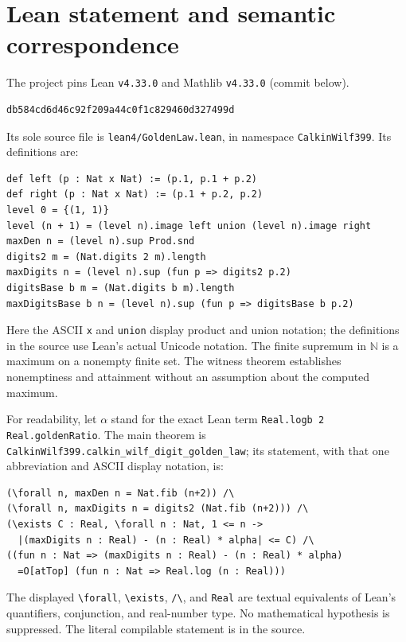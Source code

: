 \documentclass[11pt]{article}
\newcommand{\N}{\mathbb N}
\begin{document}
\section{Lean statement and semantic correspondence}
The project pins Lean \texttt{v4.33.0} and Mathlib \texttt{v4.33.0}
(commit below).
\begin{Verbatim}[fontsize=\small]
db584cd6d46c92f209a44c0f1c829460d327499d
\end{Verbatim}
Its sole source file is \texttt{lean4/GoldenLaw.lean}, in namespace \texttt{CalkinWilf399}.
Its definitions are:
\begin{Verbatim}[fontsize=\small]
def left (p : Nat x Nat) := (p.1, p.1 + p.2)
def right (p : Nat x Nat) := (p.1 + p.2, p.2)
level 0 = {(1, 1)}
level (n + 1) = (level n).image left union (level n).image right
maxDen n = (level n).sup Prod.snd
digits2 m = (Nat.digits 2 m).length
maxDigits n = (level n).sup (fun p => digits2 p.2)
digitsBase b m = (Nat.digits b m).length
maxDigitsBase b n = (level n).sup (fun p => digitsBase b p.2)
\end{Verbatim}
Here the ASCII \texttt{x} and \texttt{union} display product and union notation;
the definitions in the source use Lean's actual Unicode notation.
The finite supremum in $\N$ is a maximum on a nonempty finite set.
The witness theorem establishes nonemptiness and attainment without an
assumption about the computed maximum.

For readability, let $\alpha$ stand for the exact Lean term
\texttt{Real.logb 2 Real.goldenRatio}. The main theorem is
\texttt{CalkinWilf399.calkin\_wilf\_digit\_golden\_law}; its statement, with
that one abbreviation and ASCII display notation, is:
\begin{Verbatim}[fontsize=\small]
(\forall n, maxDen n = Nat.fib (n+2)) /\
(\forall n, maxDigits n = digits2 (Nat.fib (n+2))) /\
(\exists C : Real, \forall n : Nat, 1 <= n ->
  |(maxDigits n : Real) - (n : Real) * alpha| <= C) /\
((fun n : Nat => (maxDigits n : Real) - (n : Real) * alpha)
  =O[atTop] (fun n : Nat => Real.log (n : Real)))
\end{Verbatim}
The displayed \texttt{\textbackslash forall}, \texttt{\textbackslash exists},
\texttt{/\textbackslash}, and \texttt{Real} are textual equivalents of
Lean's quantifiers, conjunction, and real-number type. No mathematical
hypothesis is suppressed. The literal compilable statement is in the source.
\end{document}
